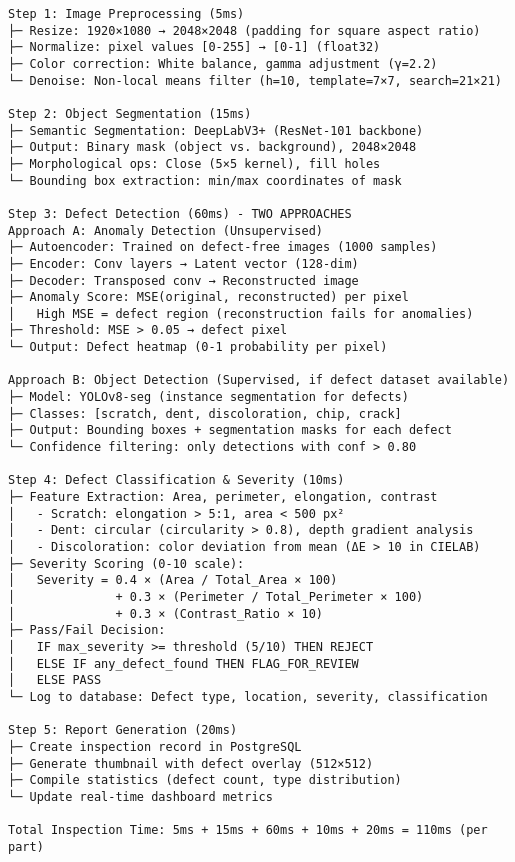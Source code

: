 \documentclass[
]{article}
\begin{document}
\begin{verbatim}
Step 1: Image Preprocessing (5ms)
├─ Resize: 1920×1080 → 2048×2048 (padding for square aspect ratio)
├─ Normalize: pixel values [0-255] → [0-1] (float32)
├─ Color correction: White balance, gamma adjustment (γ=2.2)
└─ Denoise: Non-local means filter (h=10, template=7×7, search=21×21)

Step 2: Object Segmentation (15ms)
├─ Semantic Segmentation: DeepLabV3+ (ResNet-101 backbone)
├─ Output: Binary mask (object vs. background), 2048×2048
├─ Morphological ops: Close (5×5 kernel), fill holes
└─ Bounding box extraction: min/max coordinates of mask

Step 3: Defect Detection (60ms) - TWO APPROACHES
Approach A: Anomaly Detection (Unsupervised)
├─ Autoencoder: Trained on defect-free images (1000 samples)
├─ Encoder: Conv layers → Latent vector (128-dim)
├─ Decoder: Transposed conv → Reconstructed image
├─ Anomaly Score: MSE(original, reconstructed) per pixel
│   High MSE = defect region (reconstruction fails for anomalies)
├─ Threshold: MSE > 0.05 → defect pixel
└─ Output: Defect heatmap (0-1 probability per pixel)

Approach B: Object Detection (Supervised, if defect dataset available)
├─ Model: YOLOv8-seg (instance segmentation for defects)
├─ Classes: [scratch, dent, discoloration, chip, crack]
├─ Output: Bounding boxes + segmentation masks for each defect
└─ Confidence filtering: only detections with conf > 0.80

Step 4: Defect Classification & Severity (10ms)
├─ Feature Extraction: Area, perimeter, elongation, contrast
│   - Scratch: elongation > 5:1, area < 500 px²
│   - Dent: circular (circularity > 0.8), depth gradient analysis
│   - Discoloration: color deviation from mean (ΔE > 10 in CIELAB)
├─ Severity Scoring (0-10 scale):
│   Severity = 0.4 × (Area / Total_Area × 100)
│              + 0.3 × (Perimeter / Total_Perimeter × 100)
│              + 0.3 × (Contrast_Ratio × 10)
├─ Pass/Fail Decision:
│   IF max_severity >= threshold (5/10) THEN REJECT
│   ELSE IF any_defect_found THEN FLAG_FOR_REVIEW
│   ELSE PASS
└─ Log to database: Defect type, location, severity, classification

Step 5: Report Generation (20ms)
├─ Create inspection record in PostgreSQL
├─ Generate thumbnail with defect overlay (512×512)
├─ Compile statistics (defect count, type distribution)
└─ Update real-time dashboard metrics

Total Inspection Time: 5ms + 15ms + 60ms + 10ms + 20ms = 110ms (per part)
\end{verbatim}
\end{document}
